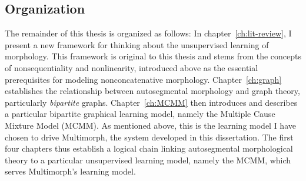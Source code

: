 \begin{definition}
%

\section{Organization}
The remainder of this thesis is organized as follows: In chapter~\ref{ch:lit-review}, I present a new framework for thinking about the unsupervised learning of morphology. This framework is original to this thesis and stems from the concepts of nonsequentiality and nonlinearity, introduced above as the essential prerequisites for modeling nonconcatenative morphology. Chapter~\ref{ch:graph} establishes the relationship between autosegmental morphology and graph theory, particularly \emph{bipartite} graphs. Chapter~\ref{ch:MCMM} then introduces and describes a particular bipartite graphical learning model, namely the Multiple Cause Mixture Model (MCMM). As mentioned above, this is the learning model I have chosen to drive Multimorph, the system developed in this dissertation. The first four chapters thus establish a logical chain linking autosegmental morphological theory to a particular unsupervised learning model, namely the MCMM, which serves Multimorph's learning model. 


\end{definition}
